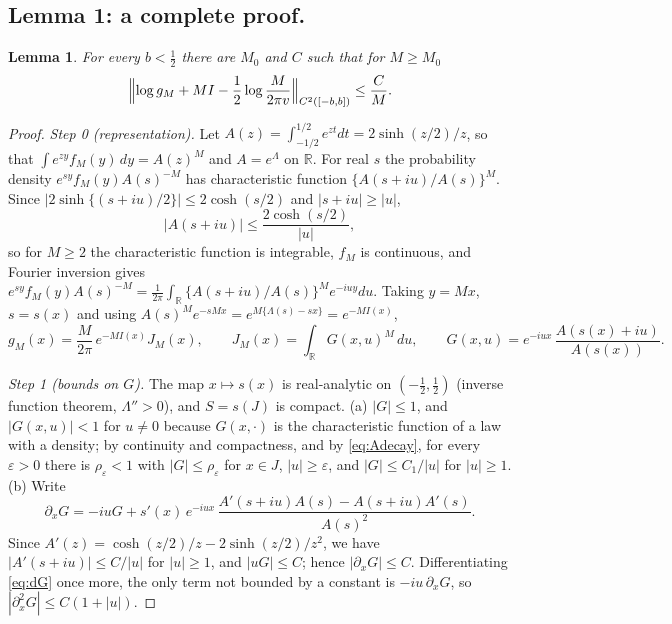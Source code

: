 \documentclass[11pt,a4paper]{article}
\newtheorem{lemma}{Lemma}
\theoremstyle{remark}
\newcommand{\R}{\mathbb R}
\numberwithin{equation}{section}
\begin{document}
\subsection{Lemma 1: a complete proof.}\label{sec:L1}

\begin{lemma}\label{lem:L1}
For every $b<\frac12$ there are $M_0$ and $C$ such that for $M\ge M_0$
\begin{equation}\label{eq:L1}
 \Bigl\|\log g_M+MI-\frac12\log\frac{M}{2\pi v}\Bigr\|_{C^2([-b,b])}\le\frac CM .
\end{equation}
\end{lemma}

\begin{proof}
\emph{Step 0 (representation).} Let $A(z)=\int_{-1/2}^{1/2}e^{zt}dt=2\sinh(z/2)/z$, so that
$\int e^{zy}f_M(y)\,dy=A(z)^M$ and $A=e^\Lambda$ on $\R$. For real $s$ the probability density
$e^{sy}f_M(y)A(s)^{-M}$ has characteristic function $\{A(s+iu)/A(s)\}^M$. Since
$|2\sinh\{(s+iu)/2\}|\le2\cosh(s/2)$ and $|s+iu|\ge|u|$,
\begin{equation}\label{eq:Adecay}
 |A(s+iu)|\le\frac{2\cosh(s/2)}{|u|},
\end{equation}
so for $M\ge2$ the characteristic function is integrable, $f_M$ is continuous, and Fourier
inversion gives
$e^{sy}f_M(y)A(s)^{-M}=\frac1{2\pi}\int_\R\{A(s+iu)/A(s)\}^Me^{-iuy}du$. Taking $y=Mx$,
$s=s(x)$ and using $A(s)^Me^{-sMx}=e^{M\{\Lambda(s)-sx\}}=e^{-MI(x)}$,
\begin{equation}\label{eq:rep}
 g_M(x)=\frac{M}{2\pi}\,e^{-MI(x)}J_M(x),\qquad J_M(x)=\int_\R G(x,u)^M\,du,\qquad
 G(x,u)=e^{-iux}\,\frac{A(s(x)+iu)}{A(s(x))}.
\end{equation}

\emph{Step 1 (bounds on $G$).} The map $x\mapsto s(x)$ is real-analytic on
$(-\frac12,\frac12)$ (inverse function theorem, $\Lambda''>0$), and $S=s(J)$ is compact.
(a) $|G|\le1$, and $|G(x,u)|<1$ for $u\ne0$ because $G(x,\cdot)$ is the characteristic
function of a law with a density; by continuity and compactness, and by
\eqref{eq:Adecay}, for every $\varepsilon>0$ there is $\rho_\varepsilon<1$ with
$|G|\le\rho_\varepsilon$ for $x\in J$, $|u|\ge\varepsilon$, and $|G|\le C_1/|u|$ for
$|u|\ge1$. (b) Write
\begin{equation}\label{eq:dG}
 \partial_xG=-iuG+s'(x)\,e^{-iux}\,\frac{A'(s+iu)A(s)-A(s+iu)A'(s)}{A(s)^2}.
\end{equation}
Since $A'(z)=\cosh(z/2)/z-2\sinh(z/2)/z^2$, we have $|A'(s+iu)|\le C/|u|$ for $|u|\ge1$, and
$|uG|\le C$; hence $|\partial_xG|\le C$. Differentiating \eqref{eq:dG} once more, the only
term not bounded by a constant is $-iu\,\partial_xG$, so $|\partial_x^2G|\le C(1+|u|)$.


\end{proof}
\end{document}
